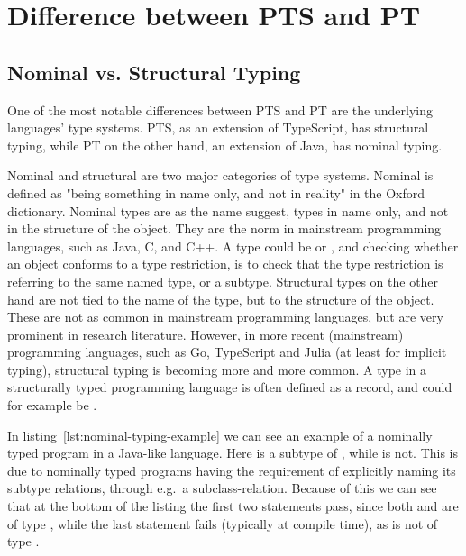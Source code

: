 
\chapter{Difference between PTS and PT}\label{ch:difference-between-pts-and-ptj}


\section{Nominal vs. Structural Typing}\label{sec:nominal-vs-structural-typing}

One of the most notable differences between PTS and PT are the underlying languages' type systems.
PTS, as an extension of TypeScript, has structural typing, while PT on the other hand, an extension of Java, has nominal typing.

Nominal and structural are two major categories of type systems.
Nominal is defined as "being something in name only, and not in reality" in the Oxford dictionary.
Nominal types are as the name suggest, types in name only, and not in the structure of the object.
They are the norm in mainstream programming languages, such as Java, C, and C++.
A type could be  or , and checking whether an object conforms to a type restriction, is to check that the type restriction is referring to the same named type, or a subtype.
Structural types on the other hand are not tied to the name of the type, but to the structure of the object.
These are not as common in mainstream programming languages, but are very prominent in research literature.
However, in more recent (mainstream) programming languages, such as Go, TypeScript and Julia (at least for implicit typing), structural typing is becoming more and more common.
A type in a structurally typed programming language is often defined as a record, and could for example be .

In listing~\vref{lst:nominal-typing-example} we can see an example of a nominally typed program in a Java-like language.
Here  is a subtype of , while  is not.
This is due to nominally typed programs having the requirement of explicitly naming its subtype relations, through e.g.\ a subclass-relation.
Because of this we can see that at the bottom of the listing the first two statements pass, since both  and  are of type , while the last statement fails (typically at compile time), as  is not of type .

